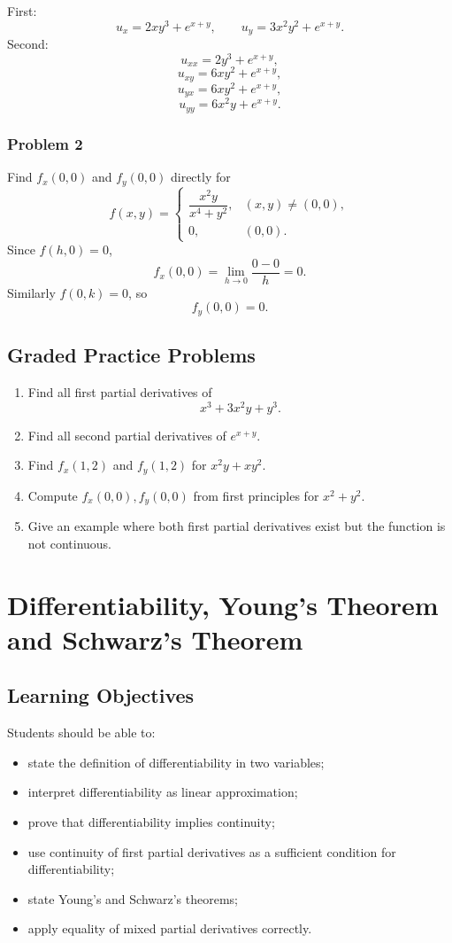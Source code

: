 \documentclass[11pt,oneside]{book}
\theoremstyle{studentthm}
\theoremstyle{definition}
\begin{document}
First:
\[
u_x=2xy^3+e^{x+y},
\qquad
u_y=3x^2y^2+e^{x+y}.
\]
Second:
\[
u_{xx}=2y^3+e^{x+y},
\]
\[
u_{xy}=6xy^2+e^{x+y},
\]
\[
u_{yx}=6xy^2+e^{x+y},
\]
\[
u_{yy}=6x^2y+e^{x+y}.
\]

\subsection*{Problem 2}
Find \(f_x(0,0)\) and \(f_y(0,0)\) directly for
\[
f(x,y)=
\begin{cases}
\dfrac{x^2y}{x^4+y^2},&(x,y)\ne(0,0),\\
0,&(0,0).
\end{cases}
\]
Since \(f(h,0)=0\),
\[
f_x(0,0)
=
\lim_{h\to0}\frac{0-0}{h}=0.
\]
Similarly \(f(0,k)=0\), so
\[
f_y(0,0)=0.
\]

\section{Graded Practice Problems}
\begin{enumerate}
\item Find all first partial derivatives of
\[
x^3+3x^2y+y^3.
\]
\item Find all second partial derivatives of \(e^{x+y}\).
\item Find \(f_x(1,2)\) and \(f_y(1,2)\) for \(x^2y+xy^2\).
\item Compute \(f_x(0,0),f_y(0,0)\) from first principles for
\(x^2+y^2\).
\item Give an example where both first partial derivatives exist but
the function is not continuous.
\end{enumerate}

\chapter{Differentiability, Young's Theorem and Schwarz's Theorem}

\section*{Learning Objectives}
Students should be able to:
\begin{itemize}
\item state the definition of differentiability in two variables;
\item interpret differentiability as linear approximation;
\item prove that differentiability implies continuity;
\item use continuity of first partial derivatives as a sufficient
condition for differentiability;
\item state Young's and Schwarz's theorems;
\item apply equality of mixed partial derivatives correctly.
\end{itemize}
\end{document}
